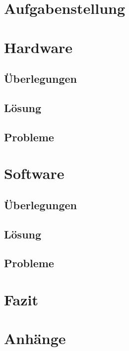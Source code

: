 \section{Aufgabenstellung}


\section{Hardware}
\subsection{Überlegungen}


\subsection{Lösung}


\subsection{Probleme}


\section{Software}
\subsection{Überlegungen}


\subsection{Lösung}


\subsection{Probleme}


\section{Fazit}


\section{Anhänge}

